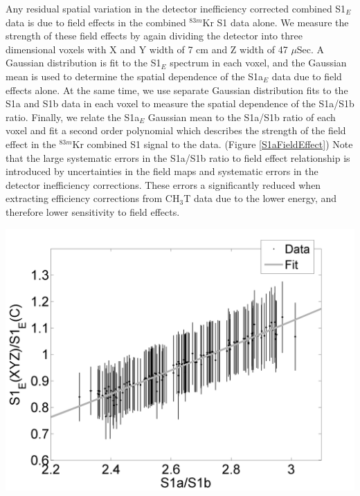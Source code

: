 \documentclass[a4paper,10pt,twocolumn]{article}
\begin{document}
Any residual spatial variation in the detector inefficiency corrected combined S1$_E$ data is due to field effects in the combined $^{83m}$Kr S1 data alone.  We measure the strength of these field effects by again dividing the detector into three dimensional voxels with X and Y width of 7 cm and Z width of 47 $\mu$Sec.  A Gaussian distribution is fit to the S1$_E$ spectrum in each voxel, and the Gaussian mean is used to determine the spatial dependence of the S1a$_E$ data due to field effects alone.  At the same time, we use separate Gaussian distribution fits to the S1a and S1b data in each voxel to measure the spatial dependence of the S1a/S1b ratio.  Finally, we relate the S1a$_E$ Gaussian mean to the S1a/S1b ratio of each voxel and fit a second order polynomial which describes the strength of the field effect in the $^{83m}$Kr combined S1 signal to the data. (Figure \ref{S1aFieldEffect}) Note that the large systematic errors in the S1a/S1b ratio to field effect relationship is introduced by uncertainties in the field maps and systematic errors in the detector inefficiency corrections.  These errors a significantly reduced when extracting efficiency corrections from CH$_3$T data due to the lower energy, and therefore lower sensitivity to field effects.

\begin{minipage}{8.15cm}
\begin{center}
\includegraphics[scale=0.4]{Run04Corrections/MatthewS1FieldEffectMeasurement.png}
\label{S1aFieldEffect}
\end{center}
\end{minipage}
\end{document}
